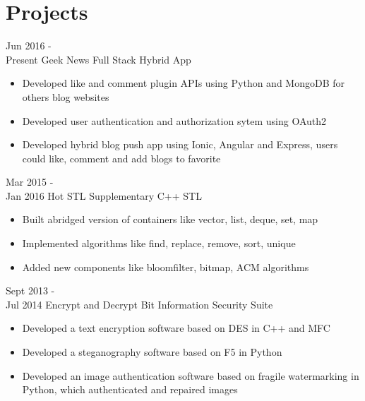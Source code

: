 \documentclass[a4paper]{twentysecondcv} %
\begin{document}

\section{Projects}

\begin{twenty} %
	\twentyitem
	{Jun 2016 - \\Present}
	{Geek News}
	{Full Stack Hybrid App}
	{}
	{
		{\begin{itemize}
				\item Developed like and comment plugin APIs using Python and MongoDB for others blog websites 
				\item Developed user authentication and authorization sytem using OAuth2
				\item Developed hybrid blog push app using Ionic, Angular and Express, users could like, comment and add blogs to favorite
		\end{itemize}}
	}

	\twentyitem
	{Mar 2015 - \\Jan 2016}
	{Hot STL}
	{Supplementary C++ STL}
	{}
	{
		{\begin{itemize}
				\item Built abridged version of containers like vector, list, deque, set, map
				\item Implemented algorithms like find, replace, remove, sort, unique
				\item Added new components like bloomfilter, bitmap, ACM algorithms
		\end{itemize}}
	}

	\twentyitem
	{Sept 2013 - \\Jul 2014}
	{Encrypt and Decrypt Bit}
	{Information Security Suite}
	{}
	{
		{\begin{itemize}
				\item Developed a text encryption software based on DES in C++ and MFC
				\item Developed a steganography software based on F5 in Python
				\item Developed an image authentication software based on fragile watermarking in Python, which authenticated and repaired images
		\end{itemize}}
	}
	
\end{twenty}
\end{document}
